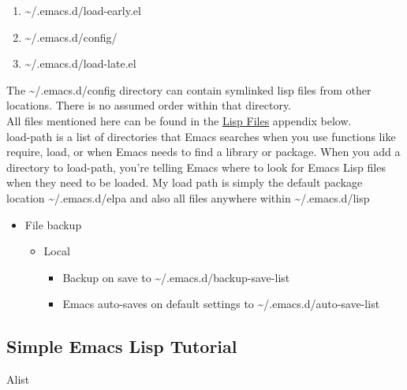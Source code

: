 \documentclass{article}
\begin{document}
\begin{enumerate}
\item \textasciitilde{}/.emacs.d/load-early.el\\[0pt]
\item \textasciitilde{}/.emacs.d/config/\\[0pt]
\item \textasciitilde{}/.emacs.d/load-late.el\\[0pt]
\end{enumerate}

The \textasciitilde{}/.emacs.d/config directory can contain symlinked lisp files from other locations. There is no assumed order within that directory.\\[0pt]

All files mentioned here can be found in the \hyperref[sec:orgab7a51c]{Lisp Files} appendix below.\\[0pt]

load-path is a list of directories that Emacs searches when you use functions like require, load, or when Emacs needs to find a library or package. When you add a directory to load-path, you're telling Emacs where to look for Emacs Lisp files when they need to be loaded. My load path is simply the default package location \textasciitilde{}/.emacs.d/elpa and also all files anywhere within \textasciitilde{}/.emacs.d/lisp\\[0pt]

\begin{itemize}
\item File backup\\[0pt]
\begin{itemize}
\item Local\\[0pt]
\begin{itemize}
\item Backup on save to \textasciitilde{}/.emacs.d/backup-save-list\\[0pt]
\item Emacs auto-saves on default settings to \textasciitilde{}/.emacs.d/auto-save-list \\[0pt]
\end{itemize}
\end{itemize}
\end{itemize}
\subsection{Simple Emacs Lisp Tutorial}
\label{sec:orgf67c5c8}
Alist\\[0pt]
\end{document}
